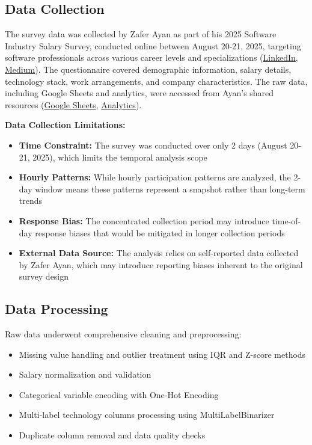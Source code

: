 \documentclass[12pt,a4paper]{article}
\begin{document}
\subsection{Data Collection}
The survey data was collected by Zafer Ayan as part of his 2025 Software Industry Salary Survey, conducted online between August 20-21, 2025, targeting software professionals across various career levels and specializations (\href{https://www.linkedin.com/posts/zaferayan_geleneksel-maa%C5%9F-anketi-buyrun-httpslnkdin-activity-7363866008664629248-7YcQ}{LinkedIn}, \href{https://zaferayan.medium.com/2025-ağustos-detaylı-maaş-anketi-98446d71920a}{Medium}). The questionnaire covered demographic information, salary details, technology stack, work arrangements, and company characteristics. The raw data, including Google Sheets and analytics, were accessed from Ayan's shared resources (\href{https://docs.google.com/spreadsheets/d/1J_MW7t9e2Yi1cErFe5XCnNGaFqXkrdufgZv9Ggnm-RE/edit?usp=sharing}{Google Sheets}, \href{https://docs.google.com/forms/d/16s95bau58GBSfVwOZ8cZm7aX7eqZU_cgA0qKw9WILxI/viewanalytics}{Analytics}).

\textbf{Data Collection Limitations:}
\begin{itemize}
    \item \textbf{Time Constraint:} The survey was conducted over only 2 days (August 20-21, 2025), which limits the temporal analysis scope
    \item \textbf{Hourly Patterns:} While hourly participation patterns are analyzed, the 2-day window means these patterns represent a snapshot rather than long-term trends
    \item \textbf{Response Bias:} The concentrated collection period may introduce time-of-day response biases that would be mitigated in longer collection periods
    \item \textbf{External Data Source:} The analysis relies on self-reported data collected by Zafer Ayan, which may introduce reporting biases inherent to the original survey design
\end{itemize}

\subsection{Data Processing}
Raw data underwent comprehensive cleaning and preprocessing:
\begin{itemize}
    \item Missing value handling and outlier treatment using IQR and Z-score methods
    \item Salary normalization and validation
    \item Categorical variable encoding with One-Hot Encoding
    \item Multi-label technology columns processing using MultiLabelBinarizer
    \item Duplicate column removal and data quality checks
\end{itemize}
\end{document}
